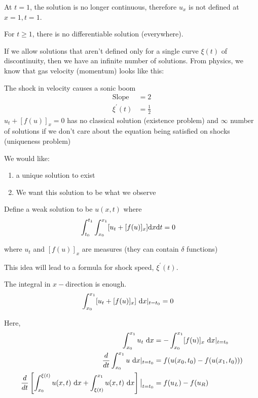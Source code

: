 \documentclass{article}
\begin{document}

  At $t = 1$, the solution is no longer continuous, therefore $u_x$ is not defined at $x = 1, t = 1$.

  For $t \geq 1$, there is no differentiable solution (everywhere).


  If we allow solutions that aren't defined only for a single curve $\xi(t)$ of discontinuity, then we have an infinite number of solutions. From physics, we know that gas velocity (momentum) looks like this:


  The shock in velocity causes a sonic boom
  \begin{align}
    \text{Slope } & = 2\\
    \xi^\prime(t) & = \frac{1}{2}
  \end{align}
  $u_t + [f(u)]_x = 0$ has no classical solution (existence problem) and $\infty$ number of solutions if we don't care about the equation being satisfied on shocks (uniqueness problem)

  We would like:
  \begin{enumerate}
    \item a unique solution to exist
    \item We want this solution to be what we observe
  \end{enumerate}

  Define a weak solution to be $u(x, t)$ where
  \begin{align}
    \int^{t_1}_{t_0} \int^{x_1}_{x_0} [u_t + [f(u)]_x] \text dx \text dt & = 0
  \end{align}

  where $u_t$ and $[f(u)]_x$ are measures (they can contain $\delta$ functions)

  This idea will lead to a formula for shock speed, $\xi^\prime(t)$.

  The integral in $x-$direction is enough.
  \begin{align}
    \int^{x_1}_{x_0} [u_t + [f(u)]_x]\ \text dx|_{t = t_0} & = 0
  \end{align}

  Here,
  \begin{align}
    \int^{x_1}_{x_0} u_t\ \text dx
    & = - \int^{x_1}_{x_0} [f(u)]_x\ \text dx |_{t = t_0}\\
    \frac{d}{dt} \int^{x_1}_{x_0} u\ \text dx |_{t = t_0}
    & = f(u(x_0, t_0) - f(u(x_1, t_0)))\\
    \frac{d}{dt} \left[ \int^{\xi(t)}_{x_0} u(x, t)\ \text dx + \int^{x_1}_{\xi(t)} u(x, t)\ \text dx \right] \big|_{t = t_0}
    & = f(u_L) - f(u_R)
  \end{align}
\end{document}
